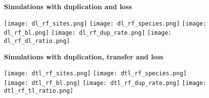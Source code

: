 \documentclass[12pt,a4paper]{article}
\begin{document}
\newcommand*{\figuretitle}[1]{%
    {\centering%
    \textbf{#1}%
    \par\medskip}%
}



\begin{figure}
\figuretitle{Simulations with duplication and loss}
\texttt{[image: dl\_rf\_sites.png]}
\texttt{[image: dl\_rf\_species.png]}
\texttt{[image: dl\_rf\_bl.png]}
\texttt{[image: dl\_rf\_dup\_rate.png]}
\texttt{[image: dl\_rf\_dl\_ratio.png]}
\end{figure}


\begin{figure}
\figuretitle{Simulations with duplication, transfer and loss}
\texttt{[image: dtl\_rf\_sites.png]}
\texttt{[image: dtl\_rf\_species.png]}
\texttt{[image: dtl\_rf\_bl.png]}
\texttt{[image: dtl\_rf\_dup\_rate.png]}
\texttt{[image: dtl\_rf\_tl\_ratio.png]}
\end{figure}


%
%
%
%
\end{document}
